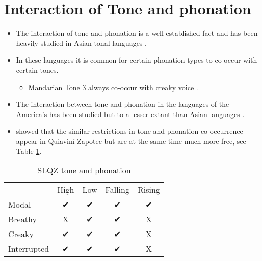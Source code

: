 \documentclass[12pt, letterpaper]{article}
\providecommand{\lsptoprule}{\midrule\toprule}
\providecommand{\lspbottomrule}{\bottomrule\midrule}
\begin{document}
\section{Interaction of Tone and phonation} \label{sec:Interaction}

\begin{itemize}
	\item The interaction of tone and phonation is a well-established fact and has been heavily studied in Asian tonal languages \citep[see references in][]{yipTone2002,michaudComplexTonesEast2012,brunelleTonePhonationSoutheast2016}.
	\item In these languages it is common for certain phonation types to co-occur with certain tones.
		\begin{itemize}
			\item Mandarian Tone 3 always co-occur with creaky voice \citep{duanmuPhonologyStandardChinese2007}.
		\end{itemize}
	\item The interaction between tone and phonation in the languages of the America's has been studied but to a lesser extant than Asian languages \citep{adlerAcousticsPhonationTypes2016,chavez-peonInteractionMetricalStructure2010,dicanioCoarticulationToneGlottal2012}. 
	\item \citet{chavez-peonInteractionMetricalStructure2010} showed that the similar restrictions in tone and phonation co-occurrence appear in Quiaviní Zapotec but are at the same time much more free, see Table \ref{tab:slqz}.
\end{itemize}

\begin{table}[!h]
\centering
\caption{SLQZ tone and phonation}
\label{tab:slqz}
 \begin{tabular}{lcccc}
  \lsptoprule
  				&	 High  & Low & Falling & Rising \\
  	Modal	& ✔︎ & ✔︎ & ✔︎ & ✔︎ \\
  	Breathy & X & ✔︎ & ✔︎ & X \\
  	Creaky & ✔︎ & ✔︎ & ✔︎ & X \\
  	Interrupted & ✔︎ & ✔︎ & ✔︎ & X \\
  \lspbottomrule
 \end{tabular}
\end{table}
\end{document}
